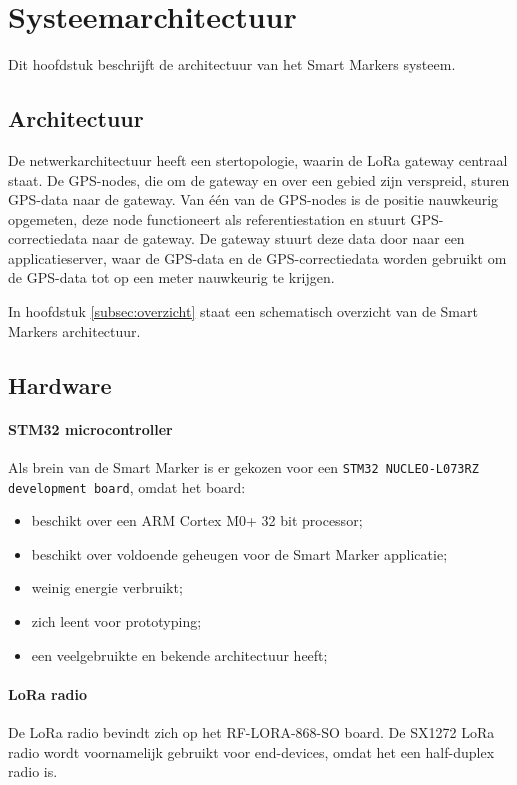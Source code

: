 \section{Systeemarchitectuur}
Dit hoofdstuk beschrijft de architectuur van het Smart Markers systeem.

\subsection{Architectuur}
De netwerkarchitectuur heeft een stertopologie, waarin de LoRa gateway centraal staat. De GPS-nodes, die om de gateway en over een gebied zijn verspreid, sturen GPS-data naar de gateway. Van één van de GPS-nodes is de positie nauwkeurig opgemeten, deze node functioneert als referentiestation en stuurt GPS-correctiedata naar de gateway. De gateway stuurt deze data door naar een applicatieserver, waar de GPS-data en de GPS-correctiedata worden gebruikt om de GPS-data tot op een meter nauwkeurig te krijgen.

In hoofdstuk \ref{subsec:overzicht} staat een schematisch overzicht van de Smart Markers architectuur.

\subsection{Hardware}
\paragraph{STM32 microcontroller}
Als brein van de Smart Marker is er gekozen voor een \texttt{STM32 NUCLEO-L073RZ development board}, omdat het board:
\begin{itemize}
    \item beschikt over een ARM Cortex M0+ 32 bit processor;
    \item beschikt over voldoende geheugen voor de Smart Marker applicatie;
    \item weinig energie verbruikt;
    \item zich leent voor prototyping;
    \item een veelgebruikte en bekende architectuur heeft;
\end{itemize}

\paragraph{LoRa radio}
De LoRa radio bevindt zich op het RF-LORA-868-SO board. De SX1272 LoRa radio wordt voornamelijk gebruikt voor end-devices, omdat het een half-duplex radio is.

